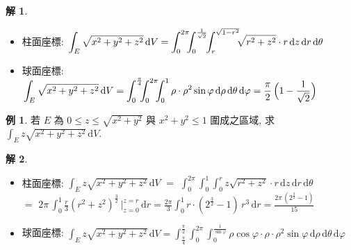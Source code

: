 \documentclass[12pt]{extarticle}
\newcommand{\ds}{\displaystyle}
\theoremstyle{definition}
\newtheorem*{ex}{例}
\newtheorem*{sol}{解}
\begin{document}
\begin{sol}
  \begin{minipage}{0.4\textwidth}
    \includegraphics[scale=0.7,page=64]{fig/prob.pdf} \\ 
  \end{minipage}
  \begin{minipage}{0.6\textwidth}
    \begin{itemize}
      \item 柱面座標: $\ds\int_E\sqrt{x^2 + y^2 + z^2}\,\text{d}V \\= \int_0^{2\pi}\!\!\!\int_0^{\frac{1}{\sqrt{2}}}\!\!\int_{r}^{\sqrt{1 - r^2}}\!\!\!\sqrt{r^2 + z^2}\cdot r\,\text{d}z\,\text{d}r\,\text{d}\theta$ 
      \item 球面座標: $\ds\int_E\sqrt{x^2 + y^2 + z^2}\,\text{d}V \\= \int_0^{\frac{\pi}{4}}\!\!\!\int_0^{2\pi}\!\!\!\int_0^{1}\rho\cdot\rho^2\sin\varphi\,\text{d}\rho\,\text{d}\theta\,\text{d}\varphi = \frac{\pi}{2}\,\Big(1 - \frac{1}{\sqrt{2}}\Big)$
    \end{itemize}
  \end{minipage}
\end{sol}

\begin{ex}
  若 $E$ 為 $0\leqslant z \leqslant\sqrt{x^2 + y^2}$ 與 $x^2 + y^2 \leqslant 1$ 圍成之區域, 求 $\ds\int_E z\sqrt{x^2 + y^2 + z^2}\,\text{d}V$.
\end{ex}

\begin{sol}
  \begin{minipage}{0.22\textwidth}
    \includegraphics[scale=0.85,page=73]{fig/prob.pdf} \\ 
  \end{minipage}
  \begin{minipage}{0.78\textwidth}
    \begin{itemize}
      \item 柱面座標: $\ds\int_E z\sqrt{x^2 + y^2 + z^2}\,\text{d}V$ $=$ $\ds\int_0^{2\pi}\!\!\!\int_0^1\!\!\!\int_{0}^{r}\!z\sqrt{r^2 + z^2}\cdot r\,\text{d}z\,\text{d}r\,\text{d}\theta$ \\$=$ $\ds 2\pi\,\int_0^1\!\frac{r}{3}(r^2 + z^2)^{\frac{3}{2}}\,\Big|_{z = 0}^{z = r}\,\text{d}r = \frac{2\pi}{3}\int_0^1 r\cdot(2^{\frac{3}{2}} - 1)\,r^3\,\text{d}r = \frac{2\pi\,(2^{\frac{3}{2}} - 1)}{15}$ 
      \item 球面座標: $\ds\int_E z\sqrt{x^2 + y^2 + z^2}\,\text{d}V = \int_{\frac{\pi}{4}}^{\frac{\pi}{2}}\!\!\!\int_0^{2\pi}\!\!\!\int_0^{\frac{1}{\sin\varphi}}\!\!\rho\cos\varphi\cdot\rho\cdot\rho^2\sin\varphi\,\text{d}\rho\,\text{d}\theta\,\text{d}\varphi$
    \end{itemize}
  \end{minipage}
\end{sol}
\end{document}
